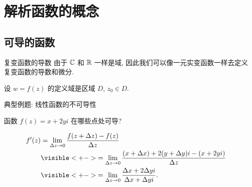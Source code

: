 \section{解析函数的概念}

\subsection{可导的函数}
\begin{frame}{复变函数的导数}
\onslide<+->
由于 ${\mathbb{C}}$ 和 ${\mathbb{R}}$ 一样是域, 因此我们可以像一元实变函数一样去定义复变函数的导数和微分.
\onslide<+->
\begin{definition}
设 $w=f(z)$ 的定义域是区域 $D$, $z_0\in D$.

\end{definition}
\end{frame}


\begin{frame}{典型例题: 线性函数的不可导性}
\onslide<+->
\begin{example}
函数 $f(z)=x+2yi$ 在哪些点处可导?
\end{example}
\onslide<+->
\begin{solution}
\vspace{-0.5\baselineskip}
\begin{align*}
f'(z)&=\lim_{\Delta z\to 0}\frac{f(z+\Delta z)-f(z)}{\Delta z}\\
&\visible<+->{=\lim_{\Delta z\to 0}\frac{(x+\Delta x)+2(y+\Delta y)i-(x+2yi)}{\Delta z}}\\
&\visible<+->{=\lim_{\Delta z\to 0}\frac{\Delta x+2\Delta y i}{\Delta x+\Delta yi}.}
\end{align*}
\end{solution}
\end{frame}



